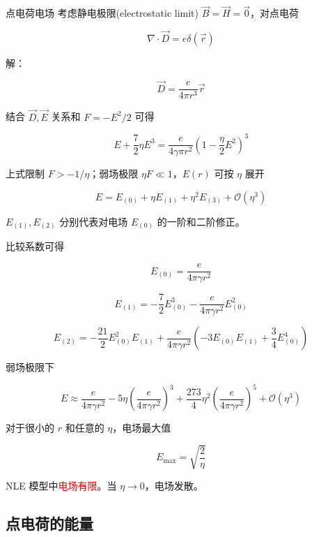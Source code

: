 \documentclass[9pt, dvipsnames]{beamer} %
\begin{document}
\begin{frame}{点电荷电场}
    考虑静电极限(electrostatic limit) $\vec{B}=\vec{H}=\vec{0} $，对点电荷

    $$
    \nabla\cdot\vec{D} = e\delta(\vec{r})
    $$
    
    解：
    
    $$
    \vec{D}
    =\frac{e }{4\pi r^3 } \vec{r}
    $$
    
    结合 $\vec{D},\vec{E} $ 关系和 $F=-E^2/2 $ 可得
    
    $$
    \boxed{
    E+\frac{7 }{2 } \eta E^3
    =\frac{e }{4\gamma \pi r^2 } \left(1-\frac{\eta  }{2 } E^2 \right)^3 
    }
    $$
    
    上式限制 $F>-1/\eta $；弱场极限 $\eta F\ll 1 $，$E(r) $ 可按 $\eta $ 展开
    
    $$
    E
    =E_{(0)} + \eta E_{(1)} + \eta^2 E_{(3)} + \mathcal{O}\left(\eta^3 \right)
    $$
    
    $E_{(1)},E_{(2)} $ 分别代表对电场 $E_{(0)} $ 的一阶和二阶修正。
\end{frame}

\begin{frame}
    比较系数可得
    
    $$
    E_{(0)}
    =\frac{e }{4\pi\gamma r^2 }
    $$
    
    $$
    E_{(1)} 
    =-\frac{7 }{2 } E_{(0)}^3 - \frac{e }{4\pi \gamma r^2 } E_{(0)}^2
    $$
    
    $$
    E_{(2)}
    =-\frac{21 }{2 } E_{(0)}^2 E_{(1)} + \frac{e }{4\pi\gamma r^2 } \left(-3E_{(0)}E_{(1)} + \frac{3 }{4 } E_{(0)}^4 \right)
    $$
    
    弱场极限下
    
    $$
    E
    \approx \frac{e }{4\pi\gamma r^2 } - 5\eta\left(\frac{e }{4\pi\gamma r^2 }  \right)^3 + \frac{273 }{4 } \eta^2\left(\frac{e }{4\pi\gamma r^2 }  \right)^5 + \mathcal{O}\left(\eta^3 \right)
    $$
    
    对于很小的 $r$ 和任意的 $\eta$，电场最大值
    
    $$
    \boxed{
    E_{\max}
    =\sqrt{\frac{2 }{\eta } }
    }
    $$
    
    NLE 模型中\textcolor{red}{电场有限}。当 $\eta\to 0 $，电场发散。
    
\end{frame}

\subsection{点电荷的能量}
\end{document}
